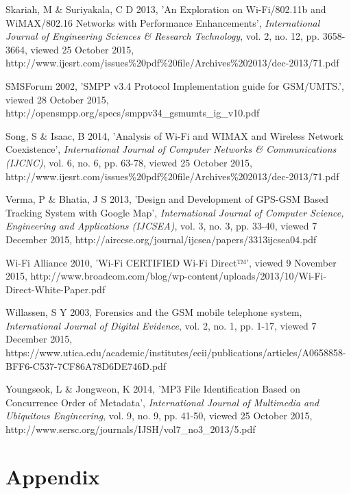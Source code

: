 \documentclass[12pt,svgnames,smaller]{article} %
\begin{document}
\begin{thebibliography}{ 10 }
		
		Skariah, M \& Suriyakala, C D 2013, 'An Exploration on Wi-Fi/802.11b and WiMAX/802.16 Networks with Performance Enhancements', \emph{International Journal of Engineering Sciences \& Research Technology}, vol. 2, no. 12, pp. 3658-3664, viewed 25 October 2015, http://www.ijesrt.com/issues\%20pdf\%20file/Archives\%202013/dec-2013/71.pdf
		
		
		SMSForum 2002, 'SMPP v3.4 Protocol Implementation guide for GSM/UMTS.', viewed 28 October 2015, http://opensmpp.org/specs/smppv34\_gsmumts\_ig\_v10.pdf
		
		
		Song, S \& Isaac, B 2014, 'Analysis of Wi-Fi and WIMAX and Wireless Network Coexistence', \emph{International Journal of Computer Networks \& Communications (IJCNC)}, vol. 6, no. 6, pp. 63-78, viewed 25 October 2015, http://www.ijesrt.com/issues\%20pdf\%20file/Archives\%202013/dec-2013/71.pdf
		
		
		Verma, P \& Bhatia, J S 2013, 'Design and Development of GPS-GSM Based Tracking System with Google Map', \emph{International Journal of Computer Science, Engineering and Applications (IJCSEA)}, vol. 3, no. 3, pp. 33-40, viewed 7 December 2015, http://airccse.org/journal/ijcsea/papers/3313ijcsea04.pdf
		
		
		Wi-Fi Alliance 2010, 'Wi-Fi CERTIFIED Wi-Fi Direct™', viewed 9 November 2015, http://www.broadcom.com/blog/wp-content/uploads/2013/10/Wi-Fi-Direct-White-Paper.pdf
		
		
		Willassen, S Y 2003, Forensics and the GSM mobile telephone system, \emph{International Journal of Digital Evidence}, vol. 2, no. 1, pp. 1-17, viewed 7 December 2015, https://www.utica.edu/academic/institutes/ecii/publications/articles/A0658858-BFF6-C537-7CF86A78D6DE746D.pdf
		
		
		Youngseok, L \& Jongweon, K 2014, 'MP3 File Identification Based on Concurrence Order of Metadata', \emph{International Journal of Multimedia and Ubiquitous Engineering}, vol. 9, no. 9, pp. 41-50, viewed 25 October 2015, http://www.sersc.org/journals/IJSH/vol7\_no3\_2013/5.pdf
		
	\end{thebibliography}
	

\section{Appendix}
\end{document}
